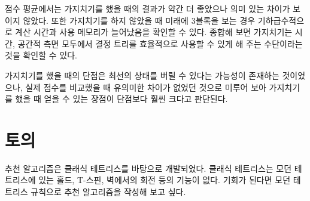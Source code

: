 점수 평균에서는 가지치기를 했을 때의 결과가 약간 더 좋았으나 의미 있는 차이가 보이지 않았다.
또한 가지치기를 하지 않았을 때 미래에 3블록을 보는 경우 기하급수적으로 계산 시간과 사용 메모리가
늘어났음을 확인할 수 있다. 종합해 보면 가지치기는 시간, 공간적 측면 모두에서 결정 트리를
효율적으로 사용할 수 있게 해 주는 수단이라는 것을 확인할 수 있다.

가지치기를 했을 때의 단점은 최선의 상태를 버릴 수 있다는 가능성이 존재하는 것이었으나, 실제 점수를 비교했을 때
유의미한 차이가 없었던 것으로 미루어 보아 가지치기를 했을 때 얻을 수 있는 장점이 단점보다 훨씬 크다고 판단된다.

\section{토의}

추천 알고리즘은 클래식 테트리스를 바탕으로 개발되었다. 클래식 테트리스는 모던 테트리스에 있는 홀드, T-스핀, 벽에서의 회전 등의 기능이 없다.
기회가 된다면 모던 테트리스 규칙으로 추천 알고리즘을 작성해 보고 싶다.



